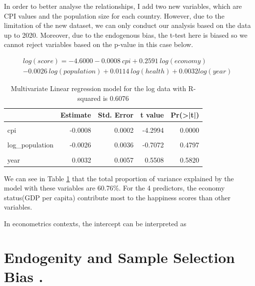 \documentclass[11pt,a4paper,]{article}
\begin{document}
In order to better analyse the relationships, I add two new variables, which are CPI values and the population size for each country. However, due to the limitation of the new dataset, we can only conduct our analysis based on the data up to 2020. Moreover, due to the endogenous bias, the t-test here is biased so we cannot reject variables based on the p-value in this case below.

\[
\begin{aligned}
log(score)= -4.6000-0.0008\ cpi+0.2591\ log(economy)\\-0.0026\ log(population)+0.0114\ log(health)+0.0032log(year)
\end{aligned}
\]

\begin{table}

\caption{\label{tab:mle}Multivariate Linear regression model for the log data with R-squared is 0.6076}
\centering
\begin{tabular}[t]{l|r|r|r|r}
\hline
  & Estimate & Std. Error & t value & Pr(>|t|)\\
\hline
\cellcolor{gray!6}{(Intercept)} & \cellcolor{gray!6}{-4.5999} & \cellcolor{gray!6}{11.5632} & \cellcolor{gray!6}{-0.3978} & \cellcolor{gray!6}{0.6909}\\
\hline
cpi & -0.0008 & 0.0002 & -4.2994 & 0.0000\\
\hline
\cellcolor{gray!6}{log\_eco} & \cellcolor{gray!6}{0.2591} & \cellcolor{gray!6}{0.0094} & \cellcolor{gray!6}{27.5487} & \cellcolor{gray!6}{0.0000}\\
\hline
log\_population & -0.0026 & 0.0036 & -0.7072 & 0.4797\\
\hline
\cellcolor{gray!6}{log\_health} & \cellcolor{gray!6}{0.0114} & \cellcolor{gray!6}{0.0042} & \cellcolor{gray!6}{2.7419} & \cellcolor{gray!6}{0.0063}\\
\hline
year & 0.0032 & 0.0057 & 0.5508 & 0.5820\\
\hline
\end{tabular}
\end{table}

We can see in Table \ref{tab:mle} that the total proportion of variance explained by the model with these variables are 60.76\%. For the 4 predictors, the economy status(GDP per capita) contribute most to the happiness scores than other variables.

In econometrics contexts, the intercept can be interpreted as

\hypertarget{endogenity-and-sample-selection-bias-.}{%
\section{Endogenity and Sample Selection Bias .}\label{endogenity-and-sample-selection-bias-.}}
\end{document}
